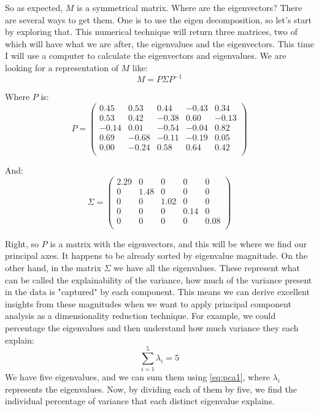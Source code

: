 \documentclass[600paper, 11pt,twoside,openany]{kdp}
\begin{document}
\indent So as expected, $M$ is a symmetrical matrix. Where are the eigenvectors? There are several ways to get them. One is to use the eigen decomposition, so let’s start by exploring that. This numerical technique will return three matrices, two of which will have what we are after, the eigenvalues and the eigenvectors. This time I will use a computer to calculate the eigenvectors and eigenvalues. We are looking for a representation of $M$ like:
\[ M = P \Sigma P^{-1}\]
\par 
\vspace{-3pt}
\indent Where $P$ is:
\[ P = 
\begin{pmatrix}
  0.45 & 0.53 & 0.44 & -0.43 & 0.34 \\
  0.53 & 0.42 & -0.38 & 0.60 & -0.13 \\
 -0.14 & 0.01 & -0.54 & -0.04 & 0.82 \\ 
  0.69 & -0.68 & -0.11 & -0.19 & 0.05 \\ 
  0.00 & -0.24 & 0.58  & 0.64 & 0.42 \\
\end{pmatrix}
\]
\par 
\vspace{-3pt}
\indent And:
\[
\Sigma = 
\begin{pmatrix}
	2.29 & 0 & 0 & 0 & 0\\
	0 & 1.48 & 0 & 0 & 0\\
	0 & 0 & 1.02 & 0 & 0 \\
	0 & 0 & 0 & 0.14 & 0\\ 
	0 & 0 & 0 & 0 & 0.08\\ 
\end{pmatrix} \]
\par 
\vspace{-3pt}
\indent Right, so $P$ is a matrix with the eigenvectors, and this will be where we find our principal axes. It happens to be already sorted by eigenvalue magnitude. On the other hand, in the matrix $\Sigma$ we have all the eigenvalues. These represent what can be called the explainability of the variance, how much of the variance present in the data is "captured" by each component. This means we can derive excellent insights from these magnitudes when we want to apply principal component analysis as a dimensionality reduction technique. For example, we could percentage the eigenvalues and then understand how much variance they each explain:
\begin{equation} \label{eq:pca1}
\sum_{i=1}^5 \lambda_i  = 5
\end{equation}
\indent We have five eigenvalues, and we can sum them using \ref{eq:pca1}, where $\lambda_i$ represents the eigenvalues. Now, by dividing each of them by five, we find the individual percentage of variance that each distinct eigenvalue explains.
\end{document}
